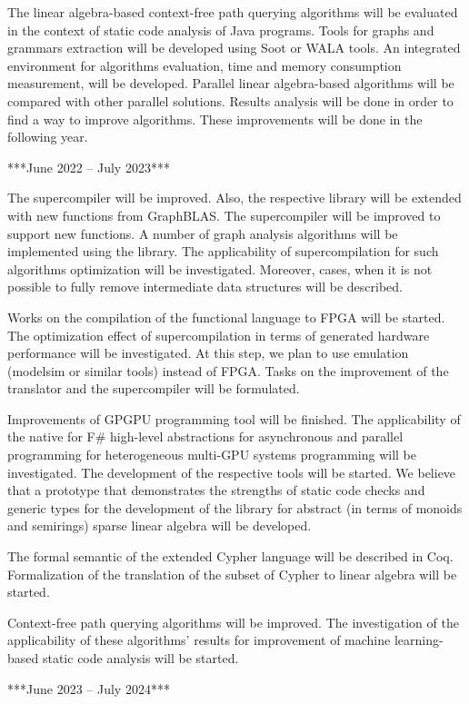 \documentclass[12pt]{article}  %
\theoremstyle{remark}
\begin{document}
The linear algebra-based context-free path querying algorithms will be evaluated in the context of static code analysis of Java programs. Tools for graphs and grammars extraction will be developed using Soot or WALA tools. An integrated environment for algorithms evaluation, time and memory consumption measurement, will be developed. Parallel linear algebra-based algorithms will be compared with other parallel solutions. Results analysis will be done in order to find a way to improve algorithms. These improvements will be done in the following year.

***June 2022 -- July 2023***

The supercompiler will be improved. Also, the respective library will be extended with new functions from GraphBLAS. The supercompiler will be improved to support new functions. A number of graph analysis algorithms will be implemented using the library. The applicability of supercompilation for such algorithms optimization will be investigated. Moreover, cases, when it is not possible to fully remove intermediate data structures will be described.

Works on the compilation of the functional language to FPGA will be started. The optimization effect of supercompilation in terms of generated hardware performance will be investigated. At this step, we plan to use emulation (modelsim or similar tools) instead of FPGA. Tasks on the improvement of the translator and the supercompiler will be formulated.

Improvements of GPGPU programming tool will be finished. The applicability of the native for F# high-level abstractions for asynchronous and parallel programming for heterogeneous multi-GPU systems programming will be investigated. The development of the respective tools will be started. We believe that a prototype that demonstrates the strengths of static code checks and generic types for the development of the library for abstract (in terms of monoids and semirings) sparse linear algebra will be developed.

The formal semantic of the extended Cypher language will be described in Coq. Formalization of the translation of the subset of Cypher to linear algebra will be started.

Context-free path querying algorithms will be improved. The investigation of the applicability of these algorithms' results for improvement of machine learning-based static code analysis will be started. 

***June 2023 -- July 2024***
\end{document}
